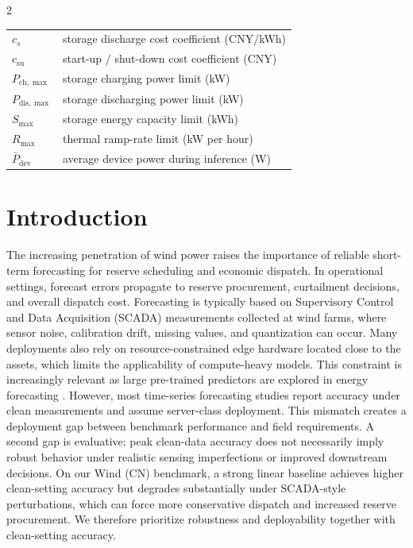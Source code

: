 \documentclass[review,3p,times]{elsarticle}
\begin{document}
\begin{center}
{\begin{minipage}{0.97\textwidth}
\begin{multicols}{2}
\begin{tabular}{@{}p{}p{}@{}}
$c_s$ & storage discharge cost coefficient (CNY/kWh) \\
$c_{\text{su}}$ & start-up / shut-down cost coefficient (CNY) \\
$P_{\text{ch},\max}$ & storage charging power limit (kW) \\
$P_{\text{dis},\max}$ & storage discharging power limit (kW) \\
$S_{\max}$ & storage energy capacity limit (kWh) \\
$R_{\max}$ & thermal ramp-rate limit (kW per hour) \\
$\bar{P}_{\text{dev}}$ & average device power during inference (W) \\
\bottomrule
\end{tabular}
\end{multicols}
\end{minipage}}
\end{center}

\section{Introduction}
\label{sec:intro}

The increasing penetration of wind power raises the importance of reliable short-term forecasting for reserve scheduling and economic dispatch. In operational settings, forecast errors propagate to reserve procurement, curtailment decisions, and overall dispatch cost. Forecasting is typically based on Supervisory Control and Data Acquisition (SCADA) measurements collected at wind farms, where sensor noise, calibration drift, missing values, and quantization can occur. Many deployments also rely on resource-constrained edge hardware located close to the assets, which limits the applicability of compute-heavy models. This constraint is increasingly relevant as large pre-trained predictors are explored in energy forecasting \cite{gao2025mmgpt,wu2024stellm}. However, most time-series forecasting studies report accuracy under clean measurements and assume server-class deployment. This mismatch creates a deployment gap between benchmark performance and field requirements. A second gap is evaluative: peak clean-data accuracy does not necessarily imply robust behavior under realistic sensing imperfections or improved downstream decisions. On our Wind (CN) benchmark, a strong linear baseline achieves higher clean-setting accuracy but degrades substantially under SCADA-style perturbations, which can force more conservative dispatch and increased reserve procurement. We therefore prioritize robustness and deployability together with clean-setting accuracy.
\end{document}
